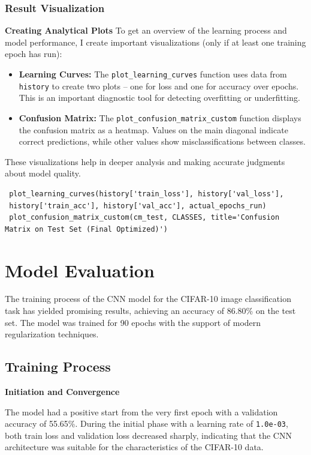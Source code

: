 \documentclass[12pt, a4paper, openany]{report}
\begin{document}
 \subsection{Result Visualization} %
 \textbf{Creating Analytical Plots} %
 To get an overview of the learning process and model performance, I create important visualizations (only if at least one training epoch has run):
 \begin{itemize}
     \item \textbf{Learning Curves:} The \texttt{plot\_learning\_curves} function uses data from \texttt{history} to create two plots – one for loss and one for accuracy over epochs. This is an important diagnostic tool for detecting overfitting or underfitting. %
     \item \textbf{Confusion Matrix:} The \texttt{plot\_confusion\_matrix\_custom} function displays the confusion matrix as a heatmap. Values on the main diagonal indicate correct predictions, while other values show misclassifications between classes. %
 \end{itemize}
 These visualizations help in deeper analysis and making accurate judgments about model quality.

 \begin{verbatim}
 plot_learning_curves(history['train_loss'], history['val_loss'],
 history['train_acc'], history['val_acc'], actual_epochs_run)
 plot_confusion_matrix_custom(cm_test, CLASSES, title='Confusion Matrix on Test Set (Final Optimized)')
 \end{verbatim}

 \chapter{Model Evaluation} %
 The training process of the CNN model for the CIFAR-10 image classification task has yielded promising results, achieving an accuracy of 86.80\% on the test set. The model was trained for 90 epochs with the support of modern regularization techniques.

 \section{Training Process} %
 \textbf{Initiation and Convergence} %

 The model had a positive start from the very first epoch with a validation accuracy of 55.65\%. During the initial phase with a learning rate of \texttt{1.0e-03}, both train loss and validation loss decreased sharply, indicating that the CNN architecture was suitable for the characteristics of the CIFAR-10 data.
\end{document}
